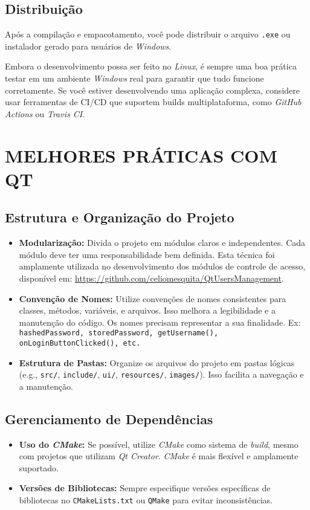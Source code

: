 \documentclass[a4paper,11pt]{article}
\newcommand{\cmake}{\textit{CMake}}
\newcommand{\build}{\textit{build}}
\newcommand{\qtcreator}{\textit{Qt Creator}}
\newcommand{\windows}{\textit{Windows}}
\newcommand{\linux}{\textit{Linux}}
\begin{document}
\subsection{Distribuição}

Após a compilação e empacotamento, você pode distribuir o arquivo \texttt{.exe} ou instalador gerado para usuários de \windows{}.

Embora o desenvolvimento possa ser feito no \linux{}, é sempre uma boa prática testar em um ambiente \windows{} real para garantir que tudo funcione corretamente. Se você estiver desenvolvendo uma aplicação complexa, considere usar ferramentas de CI/CD que suportem builds multiplataforma, como \textit{GitHub Actions} ou \textit{Travis CI}.


\section{MELHORES PRÁTICAS COM QT}


\subsection{Estrutura e Organização do Projeto}
\begin{itemize}
	\item \textbf{Modularização:} Divida o projeto em módulos claros e independentes. Cada módulo deve ter uma responsabilidade bem definida. Esta técnica foi amplamente utilizada no desenvolvimento dos módulos de controle de acesso, disponível em: \url{https://github.com/celiomesquita/QtUsersManagement}.
	
	\item \textbf{Convenção de Nomes:} Utilize convenções de nomes consistentes para classes, métodos, variáveis, e arquivos. Isso melhora a legibilidade e a manutenção do código. Os nomes precisam representar a sua finalidade. Ex: {\tt hashedPassword, storedPassword, getUsername(), onLoginButtonClicked(), etc.}
	
	\item \textbf{Estrutura de Pastas:} Organize os arquivos do projeto em pastas lógicas (e.g., \texttt{src/}, \texttt{include/}, \texttt{ui/}, \texttt{resources/}, \texttt{images/}). Isso facilita a navegação e a manutenção.
\end{itemize}

\subsection{Gerenciamento de Dependências}
\begin{itemize}
	\item \textbf{Uso do \cmake{}:} Se possível, utilize \cmake{} como sistema de \build{}, mesmo com projetos que utilizam \qtcreator{}. \cmake{} é mais flexível e amplamente suportado.
	
	\item \textbf{Versões de Bibliotecas:} Sempre especifique versões específicas de bibliotecas no {\tt CMakeLists.txt} ou {\tt QMake} para evitar inconsistências.
\end{itemize}
\end{document}
